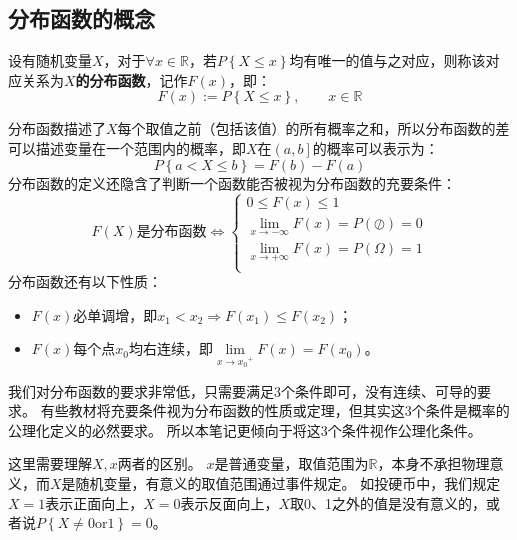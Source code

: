 \subsection{分布函数的概念}

\begin{definition}[分布函数]
设有随机变量$X$，对于$\forall x\in \mathbb{R} $，若$P\left\{ X\leqslant x \right\} $均有唯一的值与之对应，则称该对应关系为{\bf $X$的分布函数}，记作$F\left( x \right) $，即：
\[
F\left( x \right) := P\left\{ X\leqslant x \right\} ,\qquad x\in \mathbb{R}
\]
\end{definition}

分布函数描述了$X$每个取值之前（包括该值）的所有概率之和，所以分布函数的差可以描述变量在一个范围内的概率，即$X$在$\left( a,b \right] $的概率可以表示为：
\[
P\left\{ a<X\leqslant b \right\} =F\left( b \right) -F\left( a \right)
\]
分布函数的定义还隐含了判断一个函数能否被视为分布函数的充要条件：
\[
F\left( X \right) \text{是分布函数}\Leftrightarrow \begin{cases}
	0\leqslant F\left( x \right) \leqslant 1\\
	\underset{x\rightarrow -\infty}{\lim}F\left( x \right) =P\left( \oslash \right) =0\\
	\underset{x\rightarrow +\infty}{\lim}F\left( x \right) =P\left( \varOmega \right) =1\\
\end{cases}
\]
分布函数还有以下性质：
\begin{itemize}
    \item $F\left( x \right) $必单调增，即$x_1<x_2\Rightarrow F\left( x_1 \right) \leqslant F\left( x_2 \right) $；
    \item $F\left( x \right) $每个点$x_0$均右连续，即$\underset{x\rightarrow {x_0}^+}{\lim}F\left( x \right) =F\left( x_0 \right) $。
\end{itemize}

\begin{tcolorbox}
我们对分布函数的要求非常低，只需要满足3个条件即可，没有连续、可导的要求。
有些教材将充要条件视为分布函数的性质或定理，但其实这3个条件是概率的公理化定义的必然要求。
所以本笔记更倾向于将这3个条件视作公理化条件。
\end{tcolorbox}

这里需要理解$X,x$两者的区别。
$x$是普通变量，取值范围为$\mathbb{R} $，本身不承担物理意义，而$X$是随机变量，有意义的取值范围通过事件规定。
如投硬币中，我们规定$X=1$表示正面向上，$X=0$表示反面向上，$X$取0、1之外的值是没有意义的，或者说$P\left\{ X\ne 0\mathrm{or}1 \right\} =0$。

